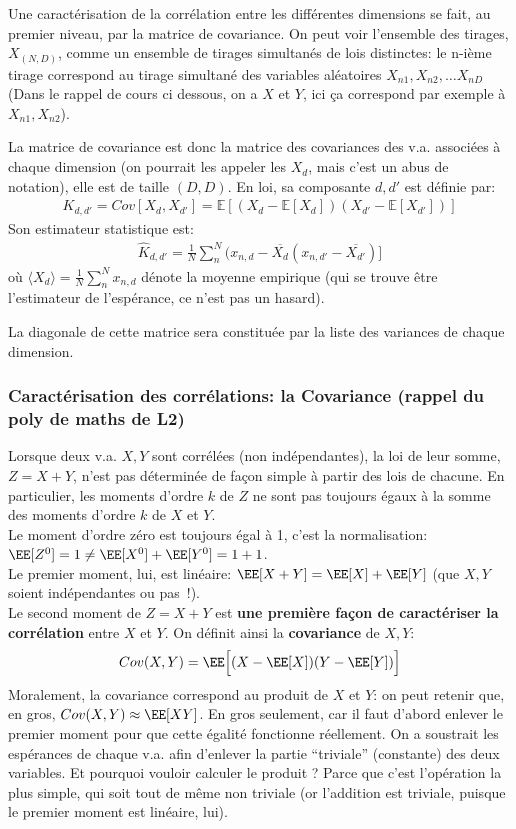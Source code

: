 \documentclass[french,twoside]{article}
\begin{document}
Une caractérisation de la corrélation entre les différentes dimensions se fait, au premier niveau, par la matrice de covariance.
On peut voir l'ensemble des tirages, $X_{(N,D)}$, comme un ensemble de tirages simultanés de lois distinctes: le n-ième tirage correspond au tirage simultané des variables aléatoires $X_{n1},X_{n2}, \ldots X_{nD}$ (Dans le rappel de cours ci dessous, on a $X$ et $Y$, ici ça correspond par exemple à $X_{n1},X_{n2}$).

La matrice de covariance est donc la matrice des covariances des v.a. associées à chaque dimension (on pourrait les appeler les $X_d$, mais c'est un abus de notation), elle est de taille $(D,D)$.
En loi, sa composante $d,d'$ est définie par:
\begin{align}
K_{d,d'} = Cov[X_d, X_{d'}] = \mathbb{E}[(X_d - \mathbb{E}[X_d])(X_{d'} - \mathbb{E}[X_{d'}])]
\end{align}
Son estimateur statistique est:
\begin{align}
\hat{K}_{d,d'} = \frac{1}{N}\sum_n^N (x_{n,d} - \overline{X_d} (x_{n,d'} - \overline{X_{d'}} )]
\end{align}
où $\langle X_d \rangle = \frac{1}{N}\sum_n^N x_{n,d}$ dénote la moyenne empirique (qui se trouve être l'estimateur de l'espérance, ce n'est pas un hasard).

La diagonale de cette matrice sera constituée par la liste des variances de chaque dimension.

\subsubsection{Caractérisation des corrélations: la Covariance (rappel du poly de maths de L2)}

Lorsque deux v.a. $X,Y$ sont corrélées (non indépendantes), la loi de leur somme, $Z=X+Y$, n'est pas déterminée de façon simple à partir des lois de chacune.
En particulier, les moments d'ordre $k$ de $Z$ ne sont pas toujours égaux à la somme des moments d'ordre $k$ de $X$ et $Y$.\\
Le moment d'ordre zéro est toujours égal à 1, c'est la normalisation: $\EE[Z^0] = 1 \neq \EE[X^0] +\EE[Y^0] =1 +1$.\\
Le premier moment, lui, est linéaire: $\EE[X+Y] = \EE[X]+\EE[Y]$ (que $X,Y$ soient indépendantes ou pas~!).\\
Le second moment de $Z=X+Y$ est \textbf{une première façon de caractériser la corrélation} entre $X$ et $Y$. On définit ainsi la \textbf{covariance} de $X,Y$:
\begin{align}
Cov(X,Y) = \EE\Big[ (X-\EE[X])(Y-\EE[Y]) \Big]
\end{align}
Moralement, la covariance correspond au produit de $X$ et $Y$: on peut retenir que, en gros, $Cov(X,Y) \approx \EE[X Y]$. En gros seulement, car il faut d'abord enlever le premier moment pour que cette égalité fonctionne réellement. On a soustrait les espérances de chaque v.a. afin d'enlever la partie ``triviale'' (constante) des deux variables.
Et pourquoi vouloir calculer le produit ? Parce que c'est l'opération la plus simple, qui soit tout de même non triviale (or l'addition est triviale, puisque le premier moment est linéaire, lui).
\end{document}
